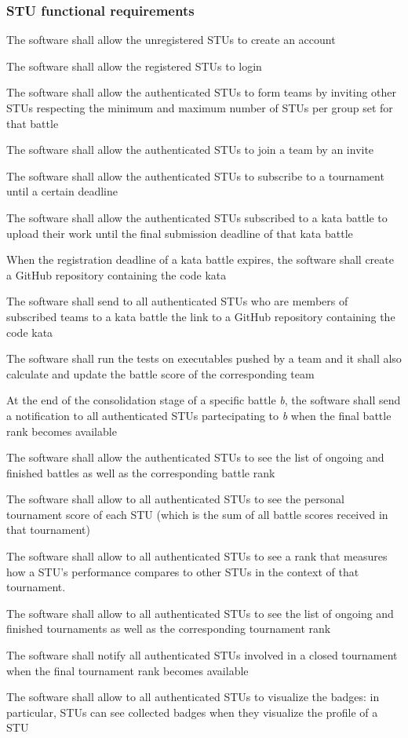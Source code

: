 \subsubsection*{STU functional requirements}
\begin{requirementsenumerate}[resume]
    \item The software shall allow the unregistered STUs to create an account
    \item The software shall allow the registered STUs to login
    \item The software shall allow the authenticated STUs to form teams by inviting other STUs respecting the minimum and maximum number of STUs per group set for that battle
    \item The software shall allow the authenticated STUs to join a team by an invite
    \item The software shall allow the authenticated STUs to subscribe to a tournament until a certain deadline
    \item The software shall allow the authenticated STUs subscribed to a kata battle to upload their work until the final submission deadline of that kata battle
    \item When the registration deadline of a kata battle expires, the software shall create a GitHub repository containing the code kata
    \item The software shall send to all authenticated STUs who are members of subscribed teams to a kata battle the link to a GitHub repository containing the code kata
    \item The software shall run the tests on executables pushed by a team and it shall also calculate and update the battle score of the corresponding team
    \item At the end of the consolidation stage of a specific battle \textit{b}, the software shall send a notification to all authenticated STUs partecipating to \textit{b} when the final battle rank becomes available
    \item The software shall allow the authenticated STUs to see the list of ongoing and finished battles as well as the corresponding battle rank
    \item The software shall allow to all authenticated STUs to see the personal tournament score of each STU (which is the sum of all battle scores received in that tournament)
    \item The software shall allow to all authenticated STUs to see a rank that measures how a STU's performance compares to other STUs in the context of that tournament.
    \item The software shall allow to all authenticated STUs to see the list of ongoing and finished tournaments as well as the corresponding tournament rank
    \item The software shall notify all authenticated STUs involved in a closed tournament when the final tournament rank becomes available
    \item The software shall allow to all authenticated STUs to visualize the badges: in particular, STUs can see collected badges when they visualize the profile of a STU
\end{requirementsenumerate}

